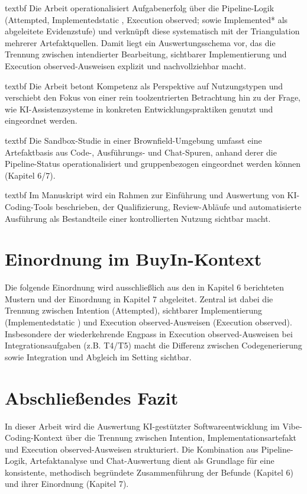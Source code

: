 \csname textbf Die Arbeit operationalisiert Aufgabenerfolg über die Pipeline-Logik (Attempted, Implementedstatic , Execution observed; sowie Implemented* als abgeleitete Evidenzstufe) und verknüpft diese systematisch mit der Triangulation mehrerer Artefaktquellen. Damit liegt ein Auswertungsschema vor, das die Trennung zwischen intendierter Bearbeitung, sichtbarer Implementierung und Execution observed-Ausweisen explizit und nachvollziehbar macht.

\csname textbf Die Arbeit betont Kompetenz als Perspektive auf Nutzungstypen und verschiebt den Fokus von einer rein toolzentrierten Betrachtung hin zu der Frage, wie KI-Assistenzsysteme in konkreten Entwicklungspraktiken genutzt und eingeordnet werden.

\csname textbf
Die Sandbox-Studie in einer Brownfield-Umgebung umfasst eine Artefaktbasis aus Code-, Ausführungs- und Chat-Spuren, anhand derer die Pipeline-Status operationalisiert und gruppenbezogen eingeordnet werden können (Kapitel 6/7).

\csname textbf Im Manuskript wird ein Rahmen zur Einführung und Auswertung von KI-Coding-Tools beschrieben, der Qualifizierung, Review-Abläufe und automatisierte Ausführung als Bestandteile einer kontrollierten Nutzung sichtbar macht.

\section{Einordnung im BuyIn-Kontext}
Die folgende Einordnung wird ausschließlich aus den in Kapitel 6 berichteten Mustern und der Einordnung in Kapitel 7 abgeleitet. Zentral ist dabei die Trennung zwischen Intention (Attempted), sichtbarer Implementierung (Implementedstatic ) und Execution observed-Ausweisen (Execution observed). Insbesondere der wiederkehrende Engpass in Execution observed-Ausweisen bei Integrationsaufgaben (z.B. T4/T5) macht die Differenz zwischen Codegenerierung sowie Integration und Abgleich im Setting sichtbar.

\section{Abschließendes Fazit}
\noindent In dieser Arbeit wird die Auswertung KI-gestützter Softwareentwicklung im Vibe-Coding-Kontext über die Trennung zwischen Intention, Implementationsartefakt und Execution observed-Ausweisen strukturiert. Die Kombination aus Pipeline-Logik, Artefaktanalyse und Chat-Auswertung dient als Grundlage für eine konsistente, methodisch begründete Zusammenführung der Befunde (Kapitel 6) und ihrer Einordnung (Kapitel 7).

